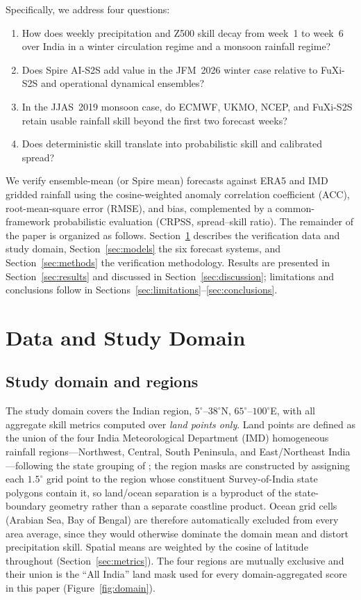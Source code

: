 \documentclass[11pt,a4paper]{article}
\begin{document}
Specifically, we address four questions:
\begin{enumerate}\setlength{\itemsep}{1pt}
  \item How does weekly precipitation and Z500 skill decay from week~1 to
        week~6 over India in a winter circulation regime and a monsoon rainfall
        regime?
  \item Does Spire AI-S2S add value in the JFM~2026 winter case relative to
        FuXi-S2S and operational dynamical ensembles?
  \item In the JJAS~2019 monsoon case, do ECMWF, UKMO, NCEP, and FuXi-S2S retain
        usable rainfall skill beyond the first two forecast weeks?
  \item Does deterministic skill translate into probabilistic skill and
        calibrated spread?
\end{enumerate}
We verify ensemble-mean (or Spire mean) forecasts against ERA5 and IMD gridded
rainfall using the cosine-weighted anomaly correlation coefficient (ACC),
root-mean-square error (RMSE), and bias, complemented by a common-framework
probabilistic evaluation (CRPSS, spread--skill ratio). The remainder of the
paper is organized as follows. Section~\ref{sec:data} describes the
verification data and study domain, Section~\ref{sec:models} the six forecast
systems, and Section~\ref{sec:methods} the verification methodology. Results
are presented in Section~\ref{sec:results} and discussed in
Section~\ref{sec:discussion}; limitations and conclusions follow in
Sections~\ref{sec:limitations}--\ref{sec:conclusions}.

\section{Data and Study Domain}\label{sec:data}

\subsection{Study domain and regions}\label{sec:domain}

The study domain covers the Indian region, $5^{\circ}$--$38^{\circ}$N,
$65^{\circ}$--$100^{\circ}$E, with all aggregate skill metrics computed over
\emph{land points only}. Land points are defined as the union of the four
India Meteorological Department (IMD) homogeneous rainfall
regions---Northwest, Central, South Peninsula, and East/Northeast
India---following the
state grouping of \citet{pai2014}; the region masks are constructed by
assigning each $1.5^{\circ}$ grid point to the region whose constituent
Survey-of-India state polygons contain it, so land/ocean separation is a
byproduct of the state-boundary geometry rather than a separate coastline
product. Ocean grid cells (Arabian Sea, Bay of Bengal) are therefore
automatically excluded from every area average, since they would otherwise
dominate the domain mean and distort precipitation skill. Spatial means are
weighted by the cosine of latitude throughout (Section~\ref{sec:metrics}).
The four regions are mutually exclusive and their union is the ``All India''
land mask used for every domain-aggregated score in this paper
(Figure~\ref{fig:domain}).
\end{document}
